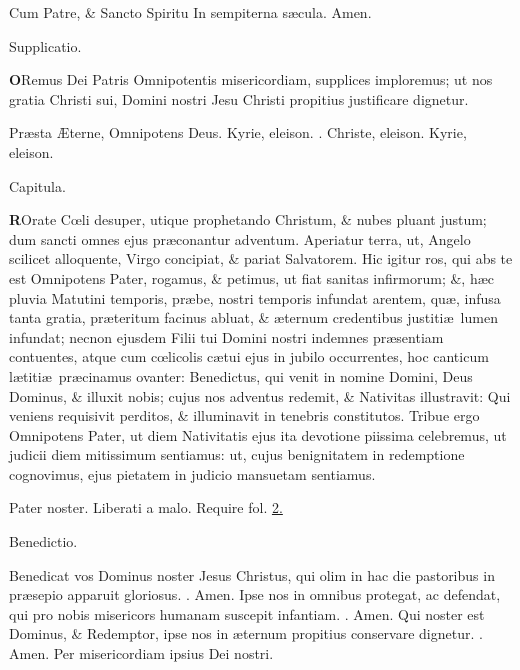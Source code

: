 \documentclass[letter,11pt]{book}
\makeatletter
\DeclareRobustCommand{\Rbar}{\vers@resp{0pt}{R}}
\newcommand{\vers@resp@sym}{\raisebox{0.2ex}{\rotatebox[origin=c]{-20}{$\m@th\rceil$}}}
\newcommand{\vers@resp}[2]{%
  {\ooalign{\hidewidth\kern#1\vers@resp@sym\hidewidth\cr#2\cr}}%
}%
\def\R{\color{Red} \Rbar . \color{black}}
\makeatother
\begin{document}
\begin{multicols*}{2}
\newline \indent Cum Patre, \& Sancto Spiritu
\newline \indent In sempiterna s\ae cula. Amen.
\vspace{-.5em} \begin{center} \color{Red} Supplicatio. \color{black} \end{center} \vspace{-.5em}
\lettrine[lines=2]{\bfseries \color{Red} O}{}Remus Dei Patris Omnipotentis misericordiam, supplices imploremus; ut nos gratia Christi sui, Domini nostri Jesu Christi propitius justificare dignetur.
\par Pr\ae sta \AE terne, Omnipotens Deus. Kyrie, eleison. \R Christe, eleison. Kyrie, eleison.
\vspace{-.5em} \begin{center} \color{Red} Capitula. \color{black} \end{center} \vspace{-.5em}
\lettrine[lines=2]{\bfseries \color{Red} R}{}Orate C\oe li desuper, utique prophetando Christum, \& nubes pluant justum; dum sancti omnes ejus pr\ae conantur adventum. Aperiatur terra, ut, Angelo scilicet alloquente, Virgo concipiat, \& pariat Salvatorem. Hic igitur ros, qui abs te est Omnipotens Pater, rogamus, \& petimus, ut fiat sanitas infirmorum; \&, h\ae c pluvia Matutini temporis, pr\ae be, nostri temporis infundat arentem, qu\ae , infusa tanta gratia, pr\ae teritum facinus abluat, \& \ae ternum credentibus justiti\ae \ lumen infundat; necnon ejusdem Filii tui Domini nostri indemnes pr\ae sentiam contuentes, atque cum c\oe licolis c\ae tui ejus in jubilo occurrentes, hoc canticum l\ae titi\ae \ pr\ae cinamus ovanter: Benedictus, qui venit in nomine Domini, Deus Dominus, \& illuxit nobis; cujus nos adventus redemit, \& Nativitas illustravit: Qui veniens requisivit perditos, \& illuminavit in tenebris constitutos. Tribue ergo Omnipotens Pater, ut diem Nativitatis ejus ita devotione piissima celebremus, ut judicii diem mitissimum sentiamus: ut, cujus benignitatem in redemptione cognovimus, ejus pietatem in judicio mansuetam sentiamus.
\par Pater noster. Liberati a malo. \color{Red} Require fol. \color{black} \hyperlink{page.2}{2.}
\vspace{-.5em} \begin{center} \color{Red} Benedictio. \color{black} \end{center} \vspace{-.5em}
\par \noindent Benedicat vos Dominus noster Jesus Christus, qui olim in hac die pastoribus in pr\ae sepio apparuit gloriosus. \R Amen. Ipse nos in omnibus protegat, ac defendat, qui pro nobis misericors humanam suscepit infantiam. \R Amen. Qui noster est Dominus, \& Redemptor, ipse nos in \ae ternum propitius conservare dignetur. \R Amen. Per misericordiam ipsius Dei nostri.

\end{multicols*}
\end{document}
